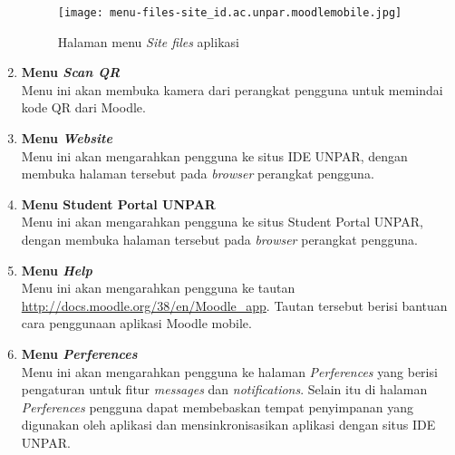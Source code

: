 \begin{enumerate}
\begin{figure}[H] 
	\centering  
	\texttt{[image: menu-files-site\_id.ac.unpar.moodlemobile.jpg]}  
	\caption[Halaman menu \textit{Site files} aplikasi] {Halaman menu \textit{Site files} aplikasi} 
	\label{app:menu:files:site} 
\end{figure}  

\item \textbf{Menu \textit{Scan QR}} \\
Menu ini akan membuka kamera dari perangkat pengguna untuk memindai kode QR dari Moodle.

\item \textbf{Menu \textit{Website}} \\
Menu ini akan mengarahkan pengguna ke situs IDE UNPAR, dengan membuka halaman tersebut pada \textit{browser} perangkat pengguna.

\item \textbf{Menu Student Portal UNPAR} \\
Menu ini akan mengarahkan pengguna ke situs Student Portal UNPAR, dengan membuka halaman tersebut pada \textit{browser} perangkat pengguna.

\item \textbf{Menu \textit{Help}} \\
Menu ini akan mengarahkan pengguna ke tautan \url{http://docs.moodle.org/38/en/Moodle\_app}. Tautan tersebut berisi bantuan cara penggunaan aplikasi Moodle mobile.

\item \textbf{Menu \textit{Perferences}} \\
Menu ini akan mengarahkan pengguna ke halaman \textit{Perferences} yang berisi pengaturan untuk fitur \textit{messages} dan \textit{notifications}. Selain itu di halaman \textit{Perferences} pengguna dapat membebaskan tempat penyimpanan yang digunakan oleh aplikasi dan mensinkronisasikan aplikasi dengan situs IDE UNPAR.


\end{enumerate}
